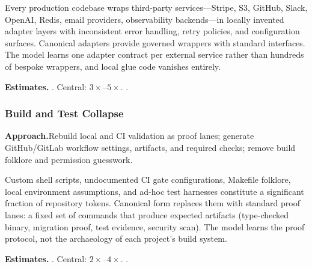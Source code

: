 Every production codebase wraps third-party services---Stripe, S3,
GitHub, Slack, OpenAI, Redis, email providers, observability
backends---in locally invented adapter layers with inconsistent error
handling, retry policies, and configuration surfaces.  Canonical adapters
provide governed wrappers with standard interfaces.  The model learns one
adapter contract per external service rather than hundreds of bespoke
wrappers, and local glue code vanishes entirely.

\smallskip\noindent
\textbf{Estimates.}\quad
{}.\quad
Central: $3\times$--$5\times$.\quad
{}.

\subsubsection{Build and Test Collapse}
\label{ssec:build-test}

\smallskip\noindent
\textbf{Approach.}\quad Rebuild local and CI validation as proof lanes; generate GitHub/GitLab workflow settings, artifacts, and required checks; remove build folklore and permission guesswork.

Custom shell scripts, undocumented CI gate configurations, Makefile
folklore, local environment assumptions, and ad-hoc test harnesses
constitute a significant fraction of repository tokens.  Canonical form
replaces them with standard proof lanes: a fixed set of commands that
produce expected artifacts (type-checked binary, migration proof, test
evidence, security scan).  The model learns the proof protocol, not the
archaeology of each project's build system.

\smallskip\noindent
\textbf{Estimates.}\quad
{}.\quad
Central: $2\times$--$4\times$.\quad
{}.


